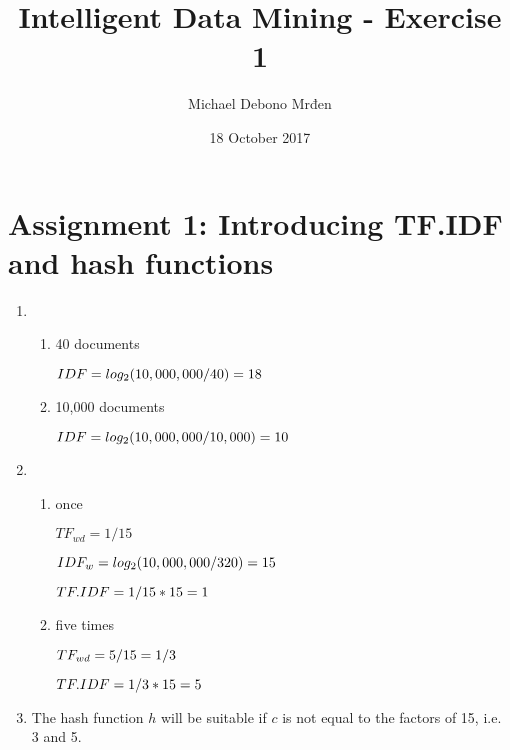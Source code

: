 \documentclass{article}
\title{Intelligent Data Mining - Exercise 1}
\author{\fontencoding{T1}\selectfont Michael Debono Mrđen}
\date{18 October 2017}
\begin{document}
\maketitle

\section{Assignment 1: Introducing TF.IDF and hash functions}
\renewcommand{\labelenumi}{\alph{enumi}.}
\renewcommand{\labelenumii}{(\alph{enumii})}
\begin{enumerate}
\item
\begin{enumerate}
\item{40 documents

$IDF \\ = log_2(10,000,000/40) \\ = 18$}

\item{10,000 documents

$IDF \\ = log_2(10,000,000/10,000) \\ = 10$}
\end{enumerate}
\item
\begin{enumerate}
\item{once

$TF_{wd} = 1/15$

$IDF_w = log_2(10,000,000/320) \\ = 15$

$TF.IDF = 1/15 * 15 \\ = 1$}

\item{five times

$TF_{wd} = 5/15 \\ = 1/3$

$TF.IDF = 1/3 * 15 \\ = 5$}
\end{enumerate}
\item{The hash function $h$ will be suitable if $c$ is not equal to the factors of 15, i.e. 3 and 5.}
\end{enumerate}
\end{document}
